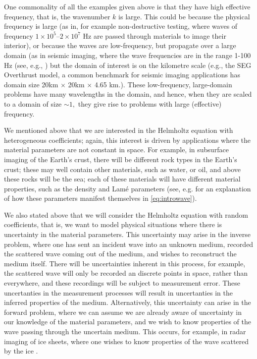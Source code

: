 One commonality of all the examples given above is that they have high effective frequency, that is, the wavenumber $k$ is large. This could be because the physical frequency is large (as in, for example non-destructive testing, where waves of frequency $1\times10^5$--$2\times10^7$ Hz \cite{Bi} are passed through materials to image their interior), or because the waves are low-frequency, but propagate over a large domain (as in seismic imaging, where the wave frequencies are in the range 1-100 Hz (see, e.g., ) but the domain of interest is on the kilometre scale (e.g., the SEG Overthrust model, a common benchmark for seismic imaging applications has domain size 20km $\times$ 20km $\times$ 4.65 km.). These low-frequency, large-domain problems have many wavelengths in the domain, and hence, when they are scaled to a domain of size $\sim 1,$ they give rise to problems with large (effective) frequency.

We mentioned above that we are interested in the Helmholtz equation with heterogeneous coefficients; again, this interest is driven by applications where the material parameters are not constant in space. For example, in subsurface imaging of the Earth's crust, there will be different rock types in the Earth's crust; these may well contain other materials, such as water, or oil, and above these rocks will be the sea; each of these materials will have different material properties, such as the density and Lam\'e parameters (see, e.g. \cite[Section 1.2.4]{Ch:15} for an explanation of how these parameters manifest themselves in \eqref{eq:introwave}).

We also stated above that we will consider the Helmholtz equation with random coefficients, that is, we want to model physical situations where there is uncertainty in the material parameters. This uncertainty may arise in the inverse problem, where one has sent an incident wave into an unknown medium, recorded the scattered wave coming out of the medium, and wishes to reconstruct the medium itself. There will be uncertainties inherent in this process, for example, the scattered wave will only be recorded an discrete points in space, rather than everywhere, and these recordings will be subject to measurement error. These uncertanties in the measurement processes will result in uncertanties in the inferred properties of the medium. Alternatively, this uncertainty can arise in the forward problem, where we can assume we are already aware of uncertainty in our knowledge of the material parameters, and we wish to know properties of the wave passing through the uncertain medium. This occurs, for example, in radar imaging of ice sheets, where one wishes to know properties of the wave scattered by the ice \cite{JiPi:18}.

